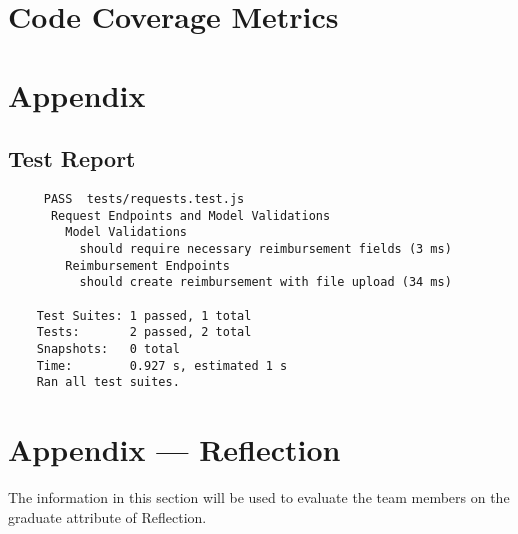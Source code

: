 \documentclass[12pt, titlepage]{article}
\begin{document}
\section{Code Coverage Metrics}

\section{Appendix}
\subsection{Test Report} \label{test_report}
\begin{small} 
  \begin{verbatim} 
     PASS  tests/requests.test.js
      Request Endpoints and Model Validations
        Model Validations
          should require necessary reimbursement fields (3 ms)
        Reimbursement Endpoints
          should create reimbursement with file upload (34 ms)

    Test Suites: 1 passed, 1 total
    Tests:       2 passed, 2 total
    Snapshots:   0 total
    Time:        0.927 s, estimated 1 s
    Ran all test suites.
  \end{verbatim}
\end{small}




\newpage{}
\section*{Appendix --- Reflection}

The information in this section will be used to evaluate the team members on the
graduate attribute of Reflection.


\end{document}
